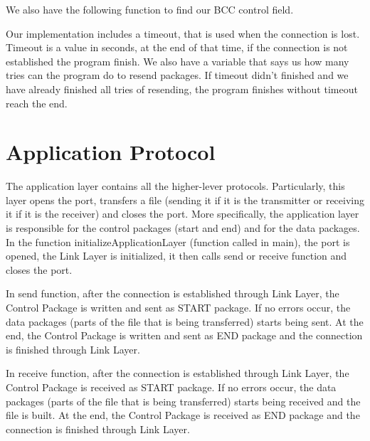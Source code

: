 \documentclass[a4paper]{article}
\begin{document}

We also have the following function to find our BCC control field.


Our implementation includes a timeout, that is used when the connection is lost. Timeout is a value in seconds, at the end of that time, if the connection is not established the program finish. We also have a variable that says us how many tries can the program do to resend packages. If timeout didn't finished and we have already finished all tries of resending, the program finishes without timeout reach the end.


\section{Application Protocol}

The application layer contains all the higher-lever protocols. Particularly, this layer opens the port, transfers a file (sending it if it is the transmitter or receiving it if it is the receiver) and closes the port. More specifically, the application layer is responsible for the control packages (start and end) and for the data packages. In the function initializeApplicationLayer (function called in main), the port is opened, the Link Layer is initialized, it then calls send or receive function and closes the port.

In send function, after the connection is established through Link Layer, the Control Package is written and sent as START package. If no errors occur, the data packages (parts of the file that is being transferred) starts being sent. At the end, the Control Package is written and sent as END package and the connection is finished through Link Layer.

In receive function, after the connection is established through Link Layer, the Control Package is received as START package. If no errors occur, the data packages (parts of the file that is being transferred) starts being received and the file is built. At the end, the Control Package is received as END package and the connection is finished through Link Layer.
\end{document}
